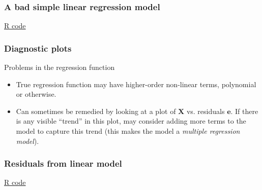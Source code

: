 \documentclass[handout]{beamer}
\begin{document}


   \begin{frame}
   \frametitle{A bad simple linear regression model}
   \begin{center}
   \end{center}
   \href{http://stats191.stanford.edu/simple_diagnostics.html#poorly-fitting-linear-model}{R code}
   \end{frame}


   \begin{frame} \frametitle{Diagnostic plots}

   \begin{block}
   {Problems in the regression function}
   \begin{itemize}

   \item True regression function may have higher-order non-linear terms, polynomial or otherwise.
   \item
   Can sometimes be remedied by looking at a plot of
   $\pmb{X}$ vs. residuals $\pmb{e}$. If there is any visible ``trend'' in this
   plot, may consider adding more terms to the model to capture this trend (this makes the model a {\em multiple regression model}).

   \end{itemize}
   \end{block}
   \end{frame}



   \begin{frame}
   \frametitle{Residuals from linear model}
   \begin{center}
   \end{center}
   \href{http://stats191.stanford.edu/simple_diagnostics.html#poorly-fitting-linear-model}{R code}
   \end{frame}
\end{document}
